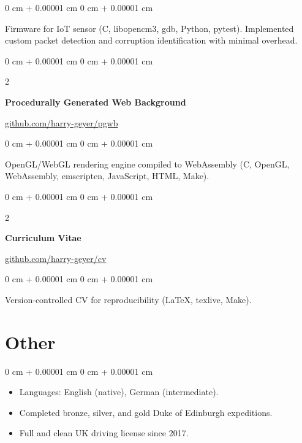 \documentclass[10pt, letterpaper]{article}
\newenvironment{highlights}{
    \begin{itemize}[
        topsep=0.15 cm,
        parsep=0.15 cm,
        partopsep=0pt,
        itemsep=0pt,
        leftmargin=0 cm + 10pt
    ]
}{
    \end{itemize}
}
\newenvironment{onecolentry}{
    \begin{adjustwidth}{
        0 cm + 0.00001 cm
    }{
        0 cm + 0.00001 cm
    }
}{
    \end{adjustwidth}
}
\newenvironment{twocolentry}[2][]{
    \onecolentry
    \def\secondColumn{#2}
    \setcolumnwidth{\fill, 4.5 cm}
    \begin{paracol}{2}
}{
    \switchcolumn \raggedleft \secondColumn
    \end{paracol}
    \endonecolentry
}
\begin{document}
        \vspace{0.10 cm}
        \begin{onecolentry}
            Firmware for IoT sensor (C, libopencm3, gdb, Python, pytest). Implemented custom packet detection and corruption identification with minimal overhead.
        \end{onecolentry}

        \vspace{0.2 cm}

        \begin{twocolentry}{\href{https://github.com/harry-geyer/pgwb}{github.com/harry-geyer/pgwb}}
            \textbf{Procedurally Generated Web Background}
        \end{twocolentry}

        \vspace{0.10 cm}
        \begin{onecolentry}
            OpenGL/WebGL rendering engine compiled to WebAssembly (C, OpenGL, WebAssembly, emscripten, JavaScript, HTML, Make).
        \end{onecolentry}

        \vspace{0.2 cm}


        \begin{twocolentry}{\href{https://github.com/harry-geyer/cv}{github.com/harry-geyer/cv}}
            \textbf{Curriculum Vitae}
        \end{twocolentry}

        \vspace{0.10 cm}
        \begin{onecolentry}
            Version-controlled CV for reproducibility (LaTeX, texlive, Make).
        \end{onecolentry}

    \section{Other}

        \begin{onecolentry}
            \begin{highlights}
                \item Languages: English (native), German (intermediate).
                \item Completed bronze, silver, and gold Duke of Edinburgh expeditions.
                \item Full and clean UK driving license since 2017.
            \end{highlights}
        \end{onecolentry}
\end{document}
